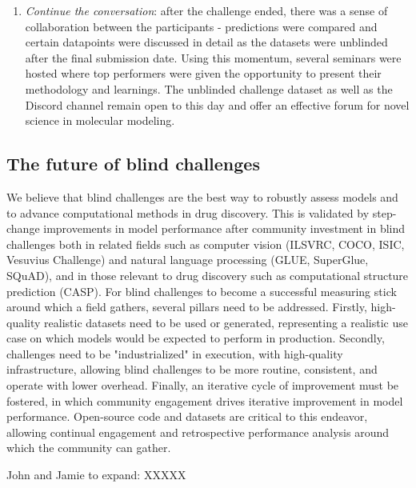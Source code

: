 \documentclass[journal=jcim,manuscript=article]{achemso}
\begin{document}
\begin{enumerate}
    \item \textit{Continue the conversation}: after the challenge ended, there was a sense of collaboration between the participants - predictions were compared and certain datapoints were discussed in detail as the datasets were unblinded after the final submission date. Using this momentum, several seminars were hosted where top performers were given the opportunity to present their methodology and learnings. The unblinded challenge dataset as well as the Discord channel remain open to this day and offer an effective forum for novel science in molecular modeling.
\end{enumerate}


\subsection{The future of blind challenges}

We believe that blind challenges are the best way to robustly assess models and to advance computational methods in drug discovery. This is validated by step-change improvements in model performance after community investment in blind challenges both in related fields such as computer vision (ILSVRC\cite{ILSVRC15}, COCO\cite{coco}, ISIC\cite{tschandl_humancomputer_2020}, Vesuvius Challenge\cite{vesuvius}) and natural language processing (GLUE\cite{wang2019gluemultitaskbenchmarkanalysis}, SuperGlue\cite{sarlin2020supergluelearningfeaturematching},  SQuAD\cite{rajpurkar2016squad100000questionsmachine}), and in those relevant to drug discovery such as computational structure prediction (CASP)\cite{casp13_2019, casp14_2021, casp15_2023}. For blind challenges to become a successful measuring stick around which a field gathers, several pillars need to be addressed. Firstly, high-quality realistic datasets need to be used or generated, representing a realistic use case on which models would be expected to perform in production. Secondly, challenges need to be "industrialized" in execution, with high-quality infrastructure, allowing blind challenges to be more routine, consistent, and operate with lower overhead. Finally, an iterative cycle of improvement must be fostered, in which community engagement drives iterative improvement in model performance. Open-source code and datasets are critical to this endeavor, allowing continual engagement and retrospective performance analysis around which the community can gather. 

John and Jamie to expand: XXXXX
\end{document}
